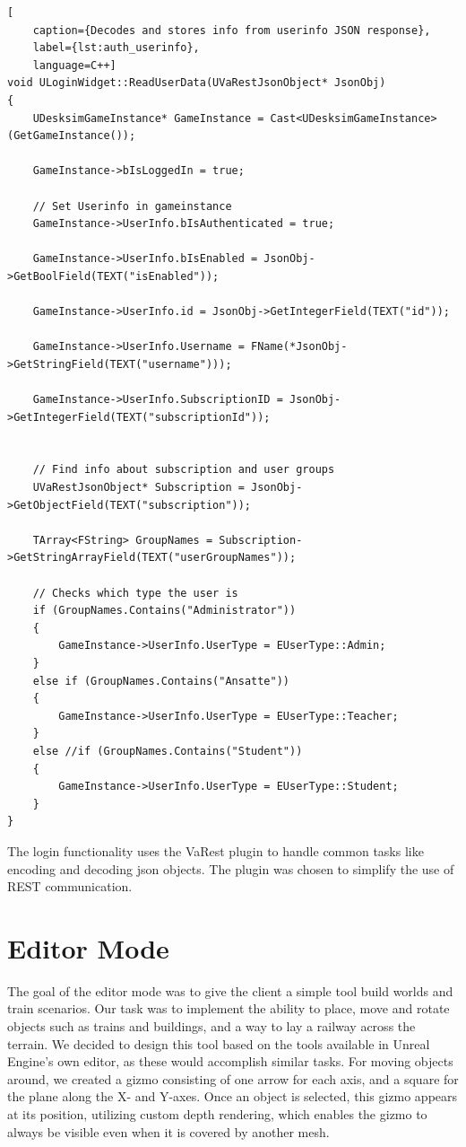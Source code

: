 \begin{lstlisting}[
    caption={Decodes and stores info from userinfo JSON response},
    label={lst:auth_userinfo},
    language=C++]
void ULoginWidget::ReadUserData(UVaRestJsonObject* JsonObj)
{
	UDesksimGameInstance* GameInstance = Cast<UDesksimGameInstance>(GetGameInstance());

	GameInstance->bIsLoggedIn = true;

	// Set Userinfo in gameinstance
	GameInstance->UserInfo.bIsAuthenticated = true;
	
	GameInstance->UserInfo.bIsEnabled = JsonObj->GetBoolField(TEXT("isEnabled"));
	
	GameInstance->UserInfo.id = JsonObj->GetIntegerField(TEXT("id"));
	
	GameInstance->UserInfo.Username = FName(*JsonObj->GetStringField(TEXT("username")));
	
	GameInstance->UserInfo.SubscriptionID = JsonObj->GetIntegerField(TEXT("subscriptionId"));


	// Find info about subscription and user groups
	UVaRestJsonObject* Subscription = JsonObj->GetObjectField(TEXT("subscription"));
	
	TArray<FString> GroupNames = Subscription->GetStringArrayField(TEXT("userGroupNames"));

	// Checks which type the user is
	if (GroupNames.Contains("Administrator"))
	{
		GameInstance->UserInfo.UserType = EUserType::Admin;
	}
	else if (GroupNames.Contains("Ansatte"))
	{
		GameInstance->UserInfo.UserType = EUserType::Teacher;
	}
	else //if (GroupNames.Contains("Student"))
	{
		GameInstance->UserInfo.UserType = EUserType::Student;
	}
}
\end{lstlisting}

The login functionality uses the VaRest plugin to handle common tasks like encoding and decoding \acrshort{json} objects. The plugin was chosen to simplify the use of REST communication.

\section{Editor Mode}
The goal of the editor mode was to give the client a simple tool build worlds and train scenarios. Our task was to implement the ability to place, move and rotate objects such as trains and buildings, and a way to lay a railway across the terrain. We decided to design this tool based on the tools available in Unreal Engine's own editor, as these would accomplish similar tasks. For moving objects around, we created a \gls{gizmo} consisting of one arrow for each axis, and a square for the plane along the X- and Y-axes. Once an object is selected, this gizmo appears at its position, utilizing custom depth rendering, which enables the gizmo to always be visible even when it is covered by another mesh. 

